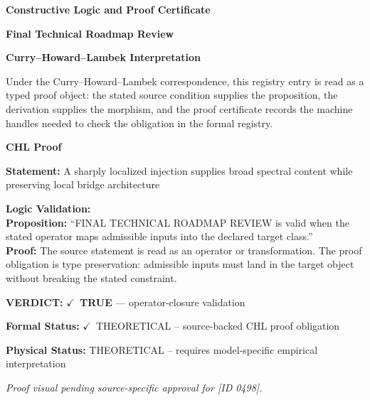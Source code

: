 \clearpage
\begingroup\tzpsupportsetup
\noindent\textbf{\fontsize{10.8pt}{12.8pt}\selectfont [ID 0498] Constructive Logic and Proof Certificate}\par
\noindent\textbf{\fontsize{10pt}{12pt}\selectfont Final Technical Roadmap Review}\par
\vspace{0.45em}
\begingroup
\footnotesize
\setlength{\parskip}{0.22em}
\setlength{\parindent}{0pt}
\noindent\textbf{Curry--Howard--Lambek Interpretation}\par
Under the Curry--Howard--Lambek correspondence, this registry entry is read as a typed proof
object: the stated source condition supplies the proposition, the derivation supplies the
morphism, and the proof certificate records the machine handles needed to check the obligation
in the formal registry.

\vspace{0.45em}
\noindent\textbf{CHL Proof}\par
\textbf{Statement:} A sharply localized injection supplies broad spectral content while preserving local
bridge architecture

\textbf{Logic Validation:}\\
\textbf{Proposition:} ``FINAL TECHNICAL ROADMAP REVIEW is valid when the stated operator maps admissible inputs
into the declared target class.''\\
\textbf{Proof:} The source statement is read as an operator or transformation. The proof obligation is
type preservation: admissible inputs must land in the target object without breaking the
stated constraint.

\textbf{VERDICT:} \ensuremath{\checkmark}\ \textbf{TRUE} --- operator-closure validation

\textbf{Formal Status:} \ensuremath{\checkmark}\ THEORETICAL -- source-backed CHL proof obligation

\textbf{Physical Status:} THEORETICAL -- requires model-specific empirical interpretation
\par\vspace{0.45em}
\par
\vfill
\begingroup\footnotesize\itshape
Proof visual pending source-specific approval for [ID 0498].
\par\endgroup
\vfill
\endgroup
\endgroup
